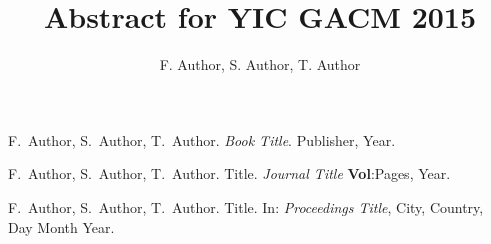 \documentclass[]{AbstractYIC2015}
\title{Abstract for YIC GACM 2015}
\author[F. Author et al.]{F. Author\authref{a}\corref, S. Author\authref{a}, T.
Author\authref{b} }
\begin{document}
\maketitle



\begin{thebibliography}{99}

F.~Author, S.~Author, T.~Author. \textit{Book Title}. Publisher, Year.

F.~Author, S.~Author, T.~Author. Title. \textit{Journal Title} %
\textbf{Vol}:Pages, Year.

F.~Author, S.~Author, T.~Author. Title. In: \textit{Proceedings Title}, City,
Country, Day Month Year.

\end{thebibliography}
\end{document}
